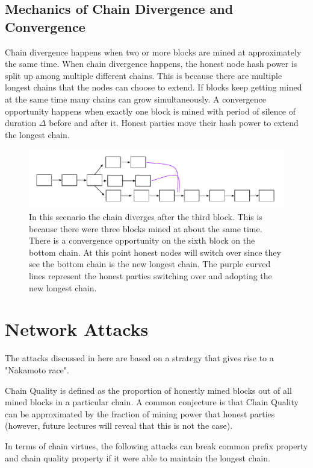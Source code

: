 \subsection{Mechanics of Chain Divergence and Convergence}
Chain divergence happens when two or more blocks are mined at approximately the same time. When chain divergence happens, the honest node hash power is split up among multiple different chains. This is because there are multiple longest chains that the nodes can choose to extend. If blocks keep getting mined at the same time many chains can grow simultaneously. A convergence opportunity happens when exactly one block is mined with  period of silence of duration $\Delta$ before and after it. Honest parties move their hash power to extend the longest chain.
\begin{figure}
    \includegraphics[width=\linewidth]{figures/divergence_convegence.pdf}
     \caption{In this scenario the chain diverges after the third block. This is because there were three blocks mined at about the same time. There is a convergence opportunity on the sixth block on the bottom chain. At this point honest nodes will switch over since they see the bottom chain is the new longest chain. The purple curved lines represent the honest parties switching over and adopting the new longest chain. }
    \label{sec:mechanics}
\end{figure}



\section{Network Attacks}
The attacks discussed in here are based on a strategy that gives rise to a "Nakamoto race".

Chain Quality is defined as the proportion of honestly mined blocks out of all mined blocks in a particular chain. A common conjecture is that Chain Quality can be approximated by the fraction of mining power that honest parties (however, future lectures will reveal that this is not the case).

In terms of chain virtues, the following attacks can break common prefix property and chain quality property if it were able to maintain the longest chain.

